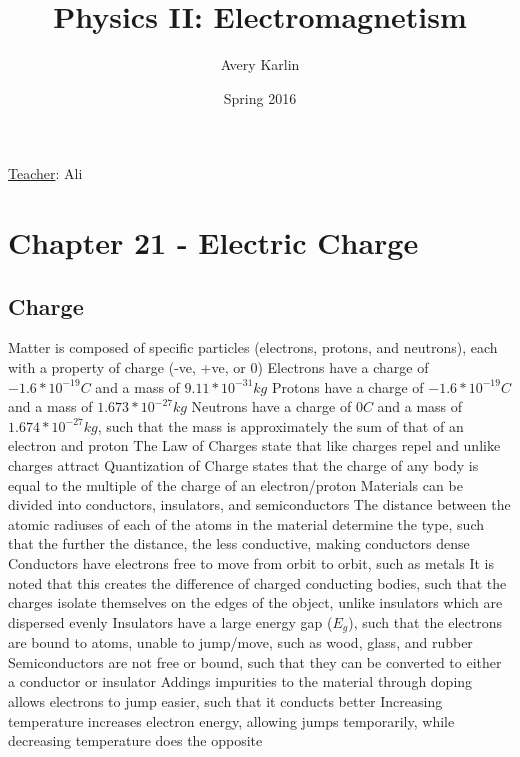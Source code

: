 \documentclass[11 pt, twoside]{article}
\newenvironment{outline*}
{
	\begin{outline}[enumerate]
	}
	{\end{outline}
}
\begin{document}
\title{Physics II: Electromagnetism}
\author{Avery Karlin}
\date{Spring 2016}
\newcommand{\teacher}{Ali}

\maketitle
\newpage
\hypertarget{content}{\tableofcontents}
\vspace{11pt}
\noindent
\underline{Teacher}: \teacher
\newpage

\section{Chapter 21 - Electric Charge}
\subsection{Charge}
\begin{outline*}
\1 Matter is composed of specific particles (electrons, protons, and neutrons), each with a property of charge (-ve, +ve, or 0)
\2 Electrons have a charge of $-1.6*10^{-19} C$ and a mass of $9.11*10^{-31} kg$
\2 Protons have a charge of $-1.6*10^{-19} C$ and a mass of $1.673*10^{-27} kg$
\2 Neutrons have a charge of $0 C$ and a mass of $1.674*10^{-27} kg$, such that the mass is approximately the sum of that of an electron and proton
\1 The Law of Charges state that like charges repel and unlike charges attract
\1 Quantization of Charge states that the charge of any body is equal to the multiple of the charge of an electron/proton
\1 Materials can be divided into conductors, insulators, and semiconductors
\2 The distance between the atomic radiuses of each of the atoms in the material determine the type, such that the further the distance, the less conductive, making conductors dense
\2 Conductors have electrons free to move from orbit to orbit, such as metals
\3 It is noted that this creates the difference of charged conducting bodies, such that the charges isolate themselves on the edges of the object, unlike insulators which are dispersed evenly
\2 Insulators have a large energy gap ($E_g$), such that the electrons are bound to atoms, unable to jump/move, such as wood, glass, and rubber
\2 Semiconductors are not free or bound, such that they can be converted to either a conductor or insulator
\3 Addings impurities to the material through doping allows electrons to jump easier, such that it conducts better
\3 Increasing temperature increases electron energy, allowing jumps temporarily, while decreasing temperature does the opposite
\end{outline*}
\end{document}
